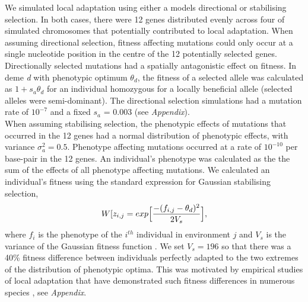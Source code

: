 \documentclass[10pt,twoside,lineno]{GSA_format}
\begin{document}
We simulated local adaptation using either a models directional or stabilising selection. In both cases, there were 12 genes distributed evenly across four of simulated chromosomes that potentially contributed to local adaptation. When assuming directional selection, fitness affecting mutations could only occur at a single nucleotide position in the centre of the 12 potentially selected genes. Directionally selected mutations had a spatially antagonistic effect on fitness. In deme \textit{d} with phenotypic optimum $\theta_d$, the fitness of a selected allele was calculated as $1 + s_a\theta_d$ for an individual homozygous for a locally beneficial allele (selected alleles were semi-dominant). The directional selection simulations had a mutation rate of $10^{-7}$ and a fixed $s_a$ = 0.003 (see \textit{Appendix}).  \\

When assuming stabilising selection, the phenotypic effects of mutations that occurred in the 12 genes had a normal distribution of phenotypic effects, with variance $\sigma_a^2 = 0.5$. Phenotype affecting mutations occurred at a rate of $10^{-10}$ per base-pair in the 12 genes. An individual's phenotype was calculated as the the sum of the effects of all phenotype affecting mutations. We calculated an individual's fitness using the standard expression for Gaussian stabilising selection,
\begin{equation}
\notag
W[z_{i,j} = exp \Big[\frac{-(f_{i,j} - \theta_d)^2}{2V_s}\Big],
\end{equation}
where $f_i$ is the phenotype of the $i^{th}$ individual in environment $j$ and $V_s$ is the variance of the Gaussian fitness function \citep{Walsh}. We set $V_s = 196$ so that there was a 40\% fitness difference between individuals perfectly adapted to the  two extremes of the distribution of phenotypic optima. This was motivated by empirical studies of local adaptation that have demonstrated such fitness differences in numerous species \citep{Hereford2009, Bontrager2020}, see \textit{Appendix}.\\ 
\end{document}
